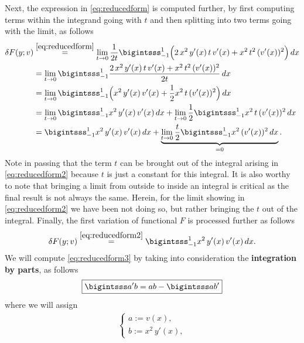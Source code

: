 \documentclass[12pt]{article}
\begin{document}
Next, the expression in \eqref{eq:reducedform} is computed further,
by first computing terms within the integrand going with $t$
and then splitting into two terms going with the limit, as follows
\begin{align}
	\delta F(y;v)
	 & \stackrel{\eqref{eq:reducedform}}{=}
	\lim_{t\to 0} \frac{1}{2t}
	\bigintsss_{-1}^{1}
	\Big(
	2\,x^2\,y^\prime(x)\,t\,v^\prime(x)
	+ x^2\,t^2\,(v^\prime(x))^2
	\Big)
	\,dx\notag                              \\
	 & =
	\lim_{t\to 0}
	\bigintsss_{-1}^{1}
	\frac{2\,x^2\,y^\prime(x)\,t\,v^\prime(x)
		+ x^2\,t^2\,(v^\prime(x))^2}{2t}
	\,dx\notag                              \\
	 & =
	\lim_{t\to 0}
	\bigintsss_{-1}^{1}
	\Big(
	x^2\,y^\prime(x)\,v^\prime(x)
	+ \frac{1}{2}x^2\,t\,(v^\prime(x))^2
	\Big)
	\,dx\notag                              \\
	 & =
	\lim_{t\to 0}
	\bigintsss_{-1}^{1}
	x^2\,y^\prime(x)\,v^\prime(x)
	\,dx
	+ 
	\lim_{t\to 0}
	\frac{1}{2}
	\bigintsss_{-1}^{1}
	x^2\,t\,(v^\prime(x))^2
	\,dx \notag                             \\
	 & =
	\bigintsss_{-1}^{1}
	x^2\,y^\prime(x)\,v^\prime(x)
	\,dx
	+
	\underbrace{\lim_{t\to 0}
		\frac{t}{2}
		\bigintsss_{-1}^{1}
		x^2\,(v^\prime(x))^2
		\,dx}_{=0}.
	\label{eq:reducedform2}
\end{align}
Note in passing that the term $t$ can be brought out of the integral 
arising in \eqref{eq:reducedform2}
because $t$ is just a constant for this integral. 
It is also worthy to note that bringing a limit from outside 
to inside an integral is critical as the final result is not always the same.
Herein, for the limit showing in \eqref{eq:reducedform2}
we have been not doing so, but rather bringing the $t$ out of the integral.
Finally, the first variation of functional $F$ is processed further as follows
\begin{align}
	\label{eq:reducedform3}
	\delta F(y;v)
	\stackrel{\eqref{eq:reducedform2}}{=}
	\bigintsss_{-1}^{1}
	x^2\,y^\prime(x)\,v^\prime(x)
	\,dx.
\end{align}
We will compute \eqref{eq:reducedform3}
by taking into consideration the \textbf{integration by parts}, as follows 
\begin{align}
	\label{eq:integrationbyparts}
	\boxed{
		\bigintsss a'b =  ab - \bigintsss ab'
	}
\end{align}
where we will assign
\begin{align}
	\label{eq:assignedab}
	\begin{cases}
		a := v(x), \\
		b := x^2\,y'(x),
	\end{cases}
\end{align}
\end{document}
